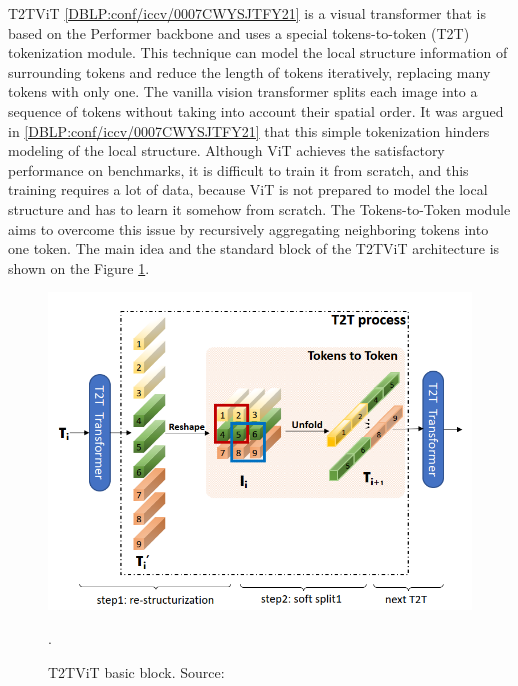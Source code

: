 \documentclass[magisterska,en]{pracamgr}
\begin{document}
T2T\textunderscore ViT \ref{DBLP:conf/iccv/0007CWYSJTFY21} is a visual transformer that is based on the Performer backbone and uses a special tokens-to-token (T2T) tokenization module. This technique can model the local structure information of surrounding tokens and reduce the length of tokens iteratively, replacing many tokens with only one. The vanilla vision transformer splits each image into a sequence of tokens without taking into account their spatial order. It was argued in \ref{DBLP:conf/iccv/0007CWYSJTFY21} that this simple tokenization hinders modeling of the local structure. Although ViT achieves the satisfactory performance on benchmarks, it is difficult to train it from scratch, and this training requires a lot of data, because ViT is not prepared to model the local structure and has to learn it somehow from scratch. The Tokens-to-Token module aims to overcome this issue by recursively aggregating neighboring tokens into one token. The main idea and the standard block of the T2T\textunderscore ViT architecture is shown on the Figure \ref{im: T2T architecture}.

\begin{figure}[H]
\centering
\includegraphics[scale=0.6]{./images/T2T_ViT_architecture.png}
\caption{T2T\textunderscore ViT basic block. Source: \cite{DBLP:conf/iccv/0007CWYSJTFY21}}.
\label{im: T2T architecture}
\end{figure}
\end{document}
